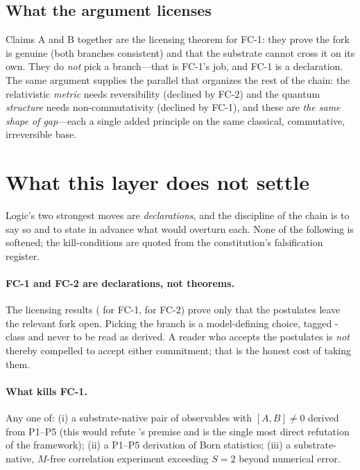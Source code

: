 \subsection*{What the argument licenses}

Claims A and B together are the licensing theorem for FC-1: they prove the fork
is genuine (both branches consistent) and that the substrate cannot cross it on
its own. They do \emph{not} pick a branch---that is FC-1's job, and FC-1 is a
declaration. The same argument supplies the parallel that organizes the rest of
the chain: the relativistic \emph{metric} needs reversibility (declined by FC-2)
and the quantum \emph{structure} needs non-commutativity (declined by FC-1), and
these are \emph{the same shape of gap}---each a single added principle on the
same classical, commutative, irreversible base.

\section{What this layer does not settle}\label{sec:boundary}

Logic's two strongest moves are \emph{declarations}, and the discipline of the
chain is to say so and to state in advance what would overturn each. None of the
following is softened; the kill-conditions are quoted from the constitution's
falsification register.

\paragraph{FC-1 and FC-2 are declarations, not theorems.} The licensing results
( for FC-1,  for FC-2) prove only that the postulates
leave the relevant fork open. Picking the branch is a model-defining choice,
tagged -class and never to be read as derived. A reader who accepts the
postulates is \emph{not} thereby compelled to accept either commitment; that is
the honest cost of taking them.

\paragraph{What kills FC-1.} Any one of: (i) a substrate-native pair of
observables with $[A,B]\neq 0$ derived from P1--P5 (this would refute
's premise and is the single most direct refutation of the
framework); (ii) a P1--P5 derivation of Born statistics; (iii) a substrate-native,
$M$-free correlation experiment exceeding $S=2$ beyond numerical error.

